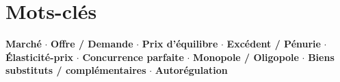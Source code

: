 \documentclass[11pt,a4paper]{article}
\begin{document}
\section*{Mots-clés}
\textcolor{mainColor}{\textbf{Marché}} $\cdot$
\textcolor{mainColor}{\textbf{Offre / Demande}} $\cdot$
\textcolor{mainColor}{\textbf{Prix d'équilibre}} $\cdot$
\textcolor{mainColor}{\textbf{Excédent / Pénurie}} $\cdot$
\textcolor{mainColor}{\textbf{Élasticité-prix}} $\cdot$
\textcolor{mainColor}{\textbf{Concurrence parfaite}} $\cdot$
\textcolor{mainColor}{\textbf{Monopole / Oligopole}} $\cdot$
\textcolor{mainColor}{\textbf{Biens substituts / complémentaires}} $\cdot$
\textcolor{mainColor}{\textbf{Autorégulation}}
\end{document}
